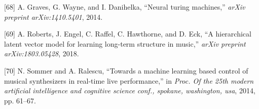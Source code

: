 \documentclass[12pt,]{article}
\begin{document}
\leavevmode\hypertarget{ref-graves2014neural}{}%
{[}68{]} A. Graves, G. Wayne, and I. Danihelka, ``Neural turing
machines,'' \emph{arXiv preprint arXiv:1410.5401}, 2014.

\leavevmode\hypertarget{ref-roberts2018hierarchical}{}%
{[}69{]} A. Roberts, J. Engel, C. Raffel, C. Hawthorne, and D. Eck, ``A
hierarchical latent vector model for learning long-term structure in
music,'' \emph{arXiv preprint arXiv:1803.05428}, 2018.

\leavevmode\hypertarget{ref-sommer2014towards}{}%
{[}70{]} N. Sommer and A. Ralescu, ``Towards a machine learning based
control of musical synthesizers in real-time live performance,'' in
\emph{Proc. Of the 25th modern artificial intelligence and cognitive
science conf., spokane, washington, usa}, 2014, pp. 61--67.
\end{document}
